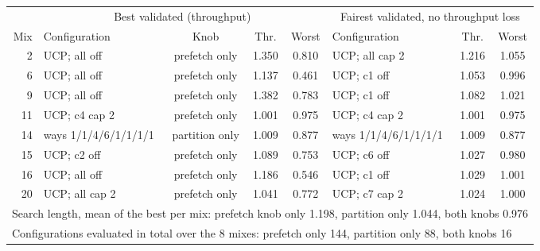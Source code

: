 \begin{tabular}{rlccclcc}
\toprule
 & \multicolumn{4}{c}{Best validated (throughput)} & \multicolumn{3}{c}{Fairest validated, no throughput loss} \\
\cmidrule(lr){2-5}\cmidrule(lr){6-8}
Mix & Configuration & Knob & Thr. & Worst & Configuration & Thr. & Worst \\
\midrule
2 & UCP; all off & prefetch only & 1.350 & 0.810 & UCP; all cap 2 & 1.216 & 1.055 \\
6 & UCP; all off & prefetch only & 1.137 & 0.461 & UCP; c1 off & 1.053 & 0.996 \\
9 & UCP; all off & prefetch only & 1.382 & 0.783 & UCP; c1 off & 1.082 & 1.021 \\
11 & UCP; c4 cap 2 & prefetch only & 1.001 & 0.975 & UCP; c4 cap 2 & 1.001 & 0.975 \\
14 & ways 1/1/4/6/1/1/1/1 & partition only & 1.009 & 0.877 & ways 1/1/4/6/1/1/1/1 & 1.009 & 0.877 \\
15 & UCP; c2 off & prefetch only & 1.089 & 0.753 & UCP; c6 off & 1.027 & 0.980 \\
16 & UCP; all off & prefetch only & 1.186 & 0.546 & UCP; c1 off & 1.029 & 1.001 \\
20 & UCP; all cap 2 & prefetch only & 1.041 & 0.772 & UCP; c7 cap 2 & 1.024 & 1.000 \\
\midrule
\multicolumn{8}{l}{Search length, mean of the best per mix: prefetch knob only 1.198, partition only 1.044, both knobs 0.976} \\
\multicolumn{8}{l}{Configurations evaluated in total over the 8 mixes: prefetch only 144, partition only 88, both knobs 16} \\
\bottomrule
\end{tabular}
